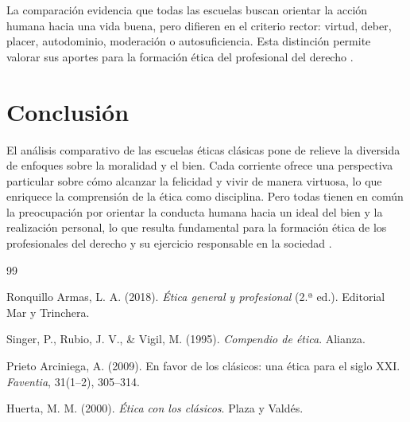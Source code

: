 \documentclass[
	spanish, %
	letterpaper, oneside
]{article}
\begin{document}
La comparación evidencia que todas las escuelas buscan orientar la acción humana hacia una vida buena, pero difieren en el criterio rector: virtud, deber, placer, autodominio, moderación o autosuficiencia. Esta distinción permite valorar sus aportes para la formación ética del profesional del derecho \citep{huerta2000etica,prieto2009favor}.


\section{Conclusión}

El análisis comparativo de las escuelas éticas clásicas pone de relieve la diversida de enfoques sobre la moralidad y el bien. Cada corriente ofrece una perspectiva particular sobre cómo alcanzar la felicidad y vivir de manera virtuosa, lo que enriquece la comprensión de la ética como disciplina. Pero todas tienen en común la preocupación por orientar la conducta humana hacia un ideal del bien y la realización personal, lo que resulta fundamental para la formación ética de los profesionales del derecho y su ejercicio responsable en la sociedad \citep{ronquillo2018etica}.

\begin{thebibliography}{99}


Ronquillo Armas, L. A. (2018). \textit{Ética general y profesional} (2.ª ed.). Editorial Mar y Trinchera.


Singer, P., Rubio, J. V., \& Vigil, M. (1995). \textit{Compendio de ética}. Alianza.


Prieto Arciniega, A. (2009). En favor de los clásicos: una ética para el siglo XXI. \textit{Faventia}, 31(1–2), 305–314.


Huerta, M. M. (2000). \textit{Ética con los clásicos}. Plaza y Valdés.

\end{thebibliography}

\end{document}
